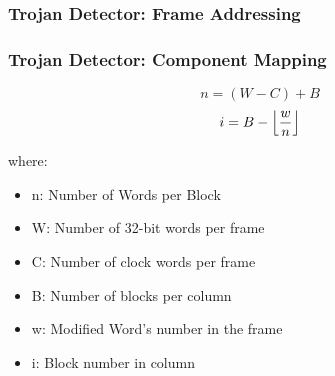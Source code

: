 \documentclass{beamer}
\DeclarePairedDelimiter\floor{\lfloor}{\rfloor}
\begin{document}
\begin{frame}
	\frametitle{Trojan Detector: Frame Addressing}
	\begin{table}
		\centering
		\caption{Bitstream Frame Address Structure}
		\label{tbl:frameAddress}
	\end{table}
\end{frame}

\begin{frame}
	\frametitle{Trojan Detector: Component Mapping}

	\begin{multicols}{2}
		\begin{equation} \label{eqn:numWordsPerBlock}
		n = (W - C) + B
		\end{equation}\break
		\begin{equation} \label{eqn:getTileNumber}
		i = B - \floor*{\frac{w}{n}}
		\end{equation}
	\end{multicols}
	where:
	\begin{itemize}
		\item n: Number of Words per Block
		\item W: Number of 32-bit words per frame
		\item C: Number of clock words per frame
		\item B: Number of blocks per column
		\item w: Modified Word's number in the frame
		\item i: Block number in column
	\end{itemize}
\end{frame}
\end{document}
